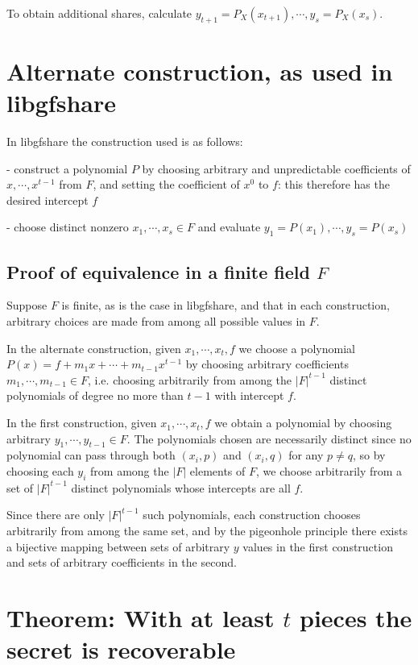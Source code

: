 \documentclass[]{article}
\begin{document}
To obtain additional shares, calculate
$y_{t+1} = P_X(x_{t+1}),\cdots,y_s=P_X(x_s)$.

\section{Alternate construction, as used in libgfshare}

In libgfshare the construction used is as follows:

- construct a polynomial $P$ by choosing arbitrary and unpredictable
  coefficients of $x,\cdots,x^{t-1}$ from $F$, and setting the coefficient
  of $x^0$ to $f$: this therefore has the desired intercept $f$

- choose distinct nonzero $x_1,\cdots,x_s \in F$ and evaluate
  $y_1 = P(x_1),\cdots,y_s = P(x_s)$

\subsection{Proof of equivalence in a finite field $F$}

Suppose $F$ is finite, as is the case in libgfshare, and that in each
construction, arbitrary choices are made from among all possible
values in $F$.

In the alternate construction, given $x_1,\cdots,x_t,f$ we choose a
polynomial $P(x) = f+m_1x+\cdots+m_{t-1}x^{t-1}$
by choosing arbitrary coefficients $m_1,\cdots,m_{t-1}\in F$, i.e.
choosing arbitrarily from among the $\left|F\right|^{t-1}$ distinct
polynomials of degree no more than $t-1$ with intercept $f$.

In the first construction, given $x_1,\cdots,x_t,f$ we obtain a polynomial
by choosing arbitrary $y_1,\cdots,y_{t-1}\in F$. The polynomials chosen
are necessarily distinct since no polynomial can pass through both $(x_i, p)$
and $(x_i, q)$ for any $p \ne q$, so by choosing each $y_i$ from among the
$\left|F\right|$ elements of $F$, we choose arbitrarily from a set of
$\left|F\right|^{t-1}$ distinct polynomials whose intercepts are all $f$.

Since there are only $\left|F\right|^{t-1}$ such polynomials, each
construction chooses arbitrarily from among the same set, and by the
pigeonhole principle there exists a bijective mapping between sets of
arbitrary $y$ values in the first construction and sets of arbitrary
coefficients in the second.

\section{Theorem: With at least $t$ pieces the secret is recoverable}
\end{document}
